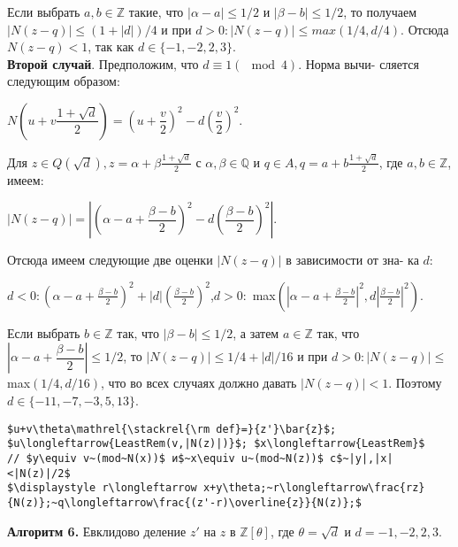 \pagebreak
%
%
\noindent
Если выбрать $a,b\in\mathbb{Z}$ такие, что $|\alpha-a|\leqslant{1/2}$ и $|\beta-b|\leqslant{1/2}$, то\linebreak
получаем $|N(z-q)|\leqslant(1+|d|)/4$ и при $d>0: |N(z-q)|\leqslant{max(1/4,d/4)}$.\linebreak
Отсюда $N(z-q)<1$, так как $d\in\{-1,-2,2,3\}$.\\
\hspace*{15pt}\textbf{Второй случай}. Предположим, что $d\equiv{1} (\mod{4})$. Норма вычи-\linebreak
сляется следующим образом:
\begin{center}
$N\left(u+v\dfrac{1+\sqrt{d}}{2}\right)=\left(u+\dfrac{v}{2}\right)^2-d\left(\dfrac{v}{2}\right)^2$.
\end{center}
Для $z\in{Q}(\sqrt{d}), z=\alpha+\beta\frac{1+\sqrt{d}}{2}$ с $\alpha,\beta\in\mathbb{Q}$ и $q\in{A}, q=a+b\frac{1+\sqrt{d}}{2}$, где\linebreak
$a,b\in\mathbb{Z}$, имеем:
\begin{center}
$|N(z-q)|=\left|\left(\alpha-a+\dfrac{\beta-b}{2}\right)^2-d\left(\dfrac{\beta-b}{2}\right)^2\right|$.
\end{center}
Отсюда имеем следующие две оценки $|N(z-q)|$ в зависимости от зна-\linebreak
ка $d$:
\begin{center}
\hspace*{43pt}$d<0 :$\hspace{20pt}$\left(\alpha-a+\frac{\beta-b}{2}\right)^2+|d|\left(\frac{\beta-b}{2}\right)^2$,\hspace{20pt}$d>0 :$\newline
max$\left(\left|\alpha-a+\frac{\beta-b}{2}\right|^2, d\left|\frac{\beta-b}{2}\right|^2\right)$.
\end{center}
Если выбрать $b\in\mathbb{Z}$ так, что $|\beta-b|\leqslant{1/2}$, а затем $a\in\mathbb{Z}$ так, что\linebreak
$\left|\alpha-a+\dfrac{\beta-b}{2}\right|\leqslant{1/2}$, то $|N(z-q)|\leqslant{1/4}+|d|/16$ и при $d>0: |N(z-q)|\leqslant$\linebreak
max$(1/4, d/16)$, что во всех случаях должно давать $|N(z-q)|<1$.\linebreak
Поэтому $d\in\{-11,-7,-3,5,13\}$.\newline
\begin{center}
\begin{lstlisting}[mathescape=true]
$u+v\theta\mathrel{\stackrel{\rm def}=}{z'}\bar{z}$;
$u\longleftarrow{LeastRem(v,|N(z)|)}$; $x\longleftarrow{LeastRem}$
// $y\equiv v~(mod~N(x))$ и$~x\equiv u~(mod~N(z))$ с$~|y|,|x|<|N(z)|/2$
$\displaystyle r\longleftarrow x+y\theta;~r\longleftarrow\frac{rz}{N(z)};~q\longleftarrow\frac{(z'-r)\overline{z}}{N(z)};$
\end{lstlisting}
\textbf{Алгоритм 6.} Евклидово деление $z'$ на $z$ в $\mathbb{Z}[\theta]$,\newline
где $\theta=\sqrt{d}$ и $d=-1, -2, 2, 3$.
\end{center}
